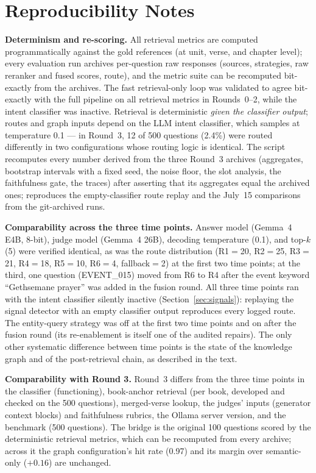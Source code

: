 \section{Reproducibility Notes}
\label{app:repro}

\textbf{Determinism and re-scoring.} All retrieval metrics are computed
programmatically against the gold references (at unit, verse, and
chapter level); every
evaluation run archives per-question raw responses (sources,
strategies, raw reranker and fused scores, route), and the metric suite
can be recomputed bit-exactly from the archives. The fast
retrieval-only loop was validated to agree bit-exactly with the full
pipeline on all retrieval metrics in Rounds~0--2, while the intent
classifier was inactive. Retrieval is deterministic \emph{given the
classifier output}; routes and graph inputs depend on the LLM intent
classifier, which samples at temperature 0.1 --- in Round~3, 12 of 500
questions (2.4\%) were routed differently in two configurations whose
routing logic is identical. The script  recomputes
every number derived from the three Round~3 archives (aggregates,
bootstrap intervals with a fixed seed, the noise floor, the slot
analysis, the faithfulness gate, the traces) after asserting that its
aggregates equal the archived ones; 
reproduces the empty-classifier route replay and the July~15
comparisons from the git-archived runs.

\textbf{Comparability across the three time points.} Answer model
(Gemma~4 E4B, 8-bit), judge model (Gemma~4 26B), decoding temperature
(0.1), and top-$k$ (5) were verified identical, as was the route
distribution (R1$=$20, R2$=$25, R3$=$21, R4$=$18, R5$=$10, R6$=$4,
fallback$=$2) at the first two time points; at the third, one question
(EVENT\_015) moved from R6 to R4 after the event keyword ``Gethsemane
prayer'' was added in the fusion round. All three time points ran with
the intent classifier silently inactive (Section~\ref{sec:signals}):
replaying the signal detector with an empty classifier output
reproduces every logged route. The entity-query strategy was off at the
first two time points and on after the fusion round (its re-enablement
is itself one of the audited repairs). The only other systematic
difference between time points is the state of the knowledge graph and
of the post-retrieval chain, as described in the text.

\textbf{Comparability with Round 3.} Round~3 differs from the three
time points in the classifier (functioning), book-anchor retrieval (per
book, developed and checked on the 500 questions), merged-verse lookup,
the judges' inputs (generator context blocks) and faithfulness rubrics,
the Ollama server version, and the benchmark (500 questions). The bridge is the
original 100 questions scored by the deterministic retrieval metrics,
which can be recomputed from every archive; across it the graph
configuration's hit rate (0.97) and its margin over semantic-only
($+0.16$) are unchanged.

